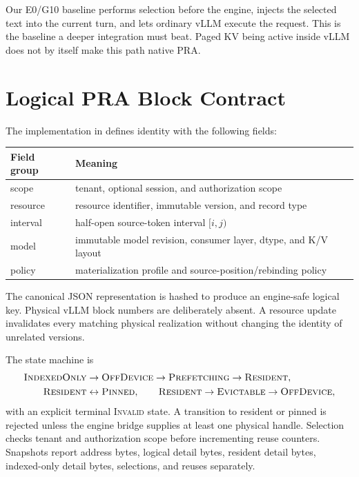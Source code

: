 \documentclass[10pt]{article}
\begin{document}
Our E0/G10 baseline performs selection before the engine, injects the selected
text into the current turn, and lets ordinary vLLM execute the request. This is
the baseline a deeper integration must beat. Paged KV being active inside vLLM
does not by itself make this path native PRA.

\section{Logical PRA Block Contract}
The implementation in  defines identity with
the following fields:
\begin{center}
\begin{tabularx}{0.96\linewidth}{lY}
\toprule
Field group & Meaning \\
\midrule
scope & tenant, optional session, and authorization scope \\
resource & resource identifier, immutable version, and record type \\
interval & half-open source-token interval $[i,j)$ \\
model & immutable model revision, consumer layer, dtype, and K/V layout \\
policy & materialization profile and source-position/rebinding policy \\
\bottomrule
\end{tabularx}
\end{center}
The canonical JSON representation is hashed to produce an engine-safe logical
key. Physical vLLM block numbers are deliberately absent. A resource update
invalidates every matching physical realization without changing the identity
of unrelated versions.

The state machine is
\[
\begin{split}
\textsc{IndexedOnly} &\rightarrow \textsc{OffDevice}
  \rightarrow \textsc{Prefetching} \rightarrow \textsc{Resident},\\
\textsc{Resident} &\leftrightarrow \textsc{Pinned},\qquad
\textsc{Resident} \rightarrow \textsc{Evictable} \rightarrow \textsc{OffDevice},
\end{split}
\]
with an explicit terminal \textsc{Invalid} state. A transition to resident or
pinned is rejected unless the engine bridge supplies at least one physical
handle. Selection checks tenant and authorization scope before incrementing
reuse counters. Snapshots report address bytes, logical detail bytes, resident
detail bytes, indexed-only detail bytes, selections, and reuses separately.
\end{document}

